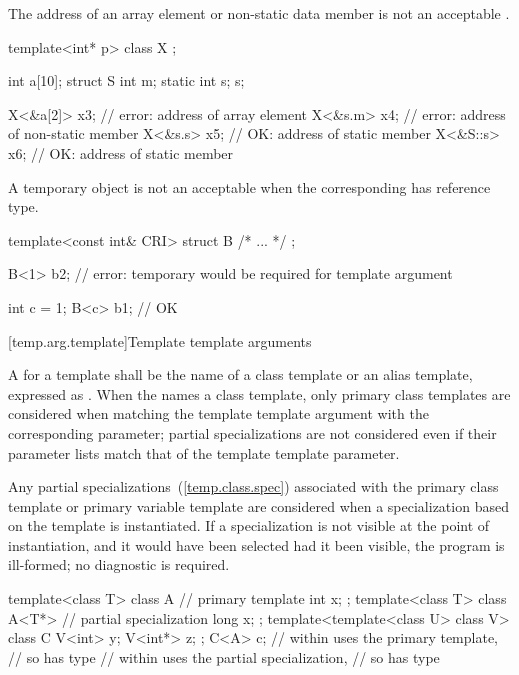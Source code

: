 \pnum
\enternote
The address of an array element or non-static data member is not an acceptable
.
\enterexample

\begin{codeblock}
template<int* p> class X { };

int a[10];
struct S { int m; static int s; } s;

X<&a[2]> x3;                    // error: address of array element
X<&s.m> x4;                     // error: address of non-static member
X<&s.s> x5;                     // OK: address of static member
X<&S::s> x6;                    // OK: address of static member
\end{codeblock}
\exitexample
\exitnote

\pnum
\enternote
A temporary object
is not an acceptable
when the corresponding
has reference type.
\enterexample

\begin{codeblock}
template<const int& CRI> struct B { /* ... */ };

B<1> b2;                        // error: temporary would be required for template argument

int c = 1;
B<c> b1;                        // OK
\end{codeblock}
\exitexample
\exitnote

[temp.arg.template]{Template template arguments}

\pnum
A
for a template
shall be the name of a class template or an alias template, expressed as
.
When the  names a class
template, only primary class templates are considered when matching the template template
argument with the corresponding parameter; partial specializations are not
considered even if their parameter lists match that of the template template
parameter.

\pnum
Any partial specializations~(\ref{temp.class.spec}) associated with the
primary class template or primary variable template are considered when a
specialization based on the template
is instantiated.
If a specialization is not visible at the point of instantiation,
and it would have been selected had it been visible, the program is ill-formed;
no diagnostic is required.
\enterexample

\begin{codeblock}
template<class T> class A {     // primary template
  int x;
};
template<class T> class A<T*> { // partial specialization
  long x;
};
template<template<class U> class V> class C {
  V<int>  y;
  V<int*> z;
};
C<A> c;                         //  within  uses the primary template,
                                // so  has type 
                                //  within  uses the partial specialization,
                                // so  has type 
\end{codeblock}
\exitexample

